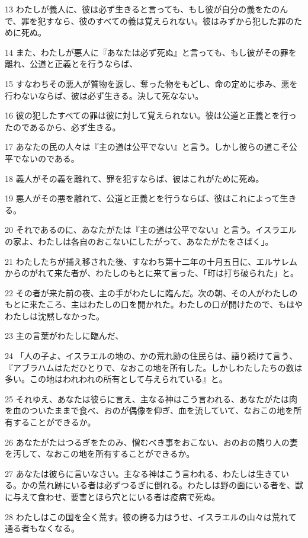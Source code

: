 \par 13 わたしが義人に、彼は必ず生きると言っても、もし彼が自分の義をたのんで、罪を犯すなら、彼のすべての義は覚えられない。彼はみずから犯した罪のために死ぬ。
\par 14 また、わたしが悪人に『あなたは必ず死ぬ』と言っても、もし彼がその罪を離れ、公道と正義とを行うならば、
\par 15 すなわちその悪人が質物を返し、奪った物をもどし、命の定めに歩み、悪を行わないならば、彼は必ず生きる。決して死なない。
\par 16 彼の犯したすべての罪は彼に対して覚えられない。彼は公道と正義とを行ったのであるから、必ず生きる。
\par 17 あなたの民の人々は『主の道は公平でない』と言う。しかし彼らの道こそ公平でないのである。
\par 18 義人がその義を離れて、罪を犯すならば、彼はこれがために死ぬ。
\par 19 悪人がその悪を離れて、公道と正義とを行うならば、彼はこれによって生きる。
\par 20 それであるのに、あなたがたは『主の道は公平でない』と言う。イスラエルの家よ、わたしは各自のおこないにしたがって、あなたがたをさばく」。
\par 21 わたしたちが捕え移された後、すなわち第十二年の十月五日に、エルサレムからのがれて来た者が、わたしのもとに来て言った、「町は打ち破られた」と。
\par 22 その者が来た前の夜、主の手がわたしに臨んだ。次の朝、その人がわたしのもとに来たころ、主はわたしの口を開かれた。わたしの口が開けたので、もはやわたしは沈黙しなかった。
\par 23 主の言葉がわたしに臨んだ、
\par 24 「人の子よ、イスラエルの地の、かの荒れ跡の住民らは、語り続けて言う、『アブラハムはただひとりで、なおこの地を所有した。しかしわたしたちの数は多い。この地はわれわれの所有として与えられている』と。
\par 25 それゆえ、あなたは彼らに言え、主なる神はこう言われる、あなたがたは肉を血のついたままで食べ、おのが偶像を仰ぎ、血を流していて、なおこの地を所有することができるか。
\par 26 あなたがたはつるぎをたのみ、憎むべき事をおこない、おのおの隣り人の妻を汚して、なおこの地を所有することができるか。
\par 27 あなたは彼らに言いなさい。主なる神はこう言われる、わたしは生きている。かの荒れ跡にいる者は必ずつるぎに倒れる。わたしは野の面にいる者を、獣に与えて食わせ、要害とほら穴とにいる者は疫病で死ぬ。
\par 28 わたしはこの国を全く荒す。彼の誇る力はうせ、イスラエルの山々は荒れて通る者もなくなる。
